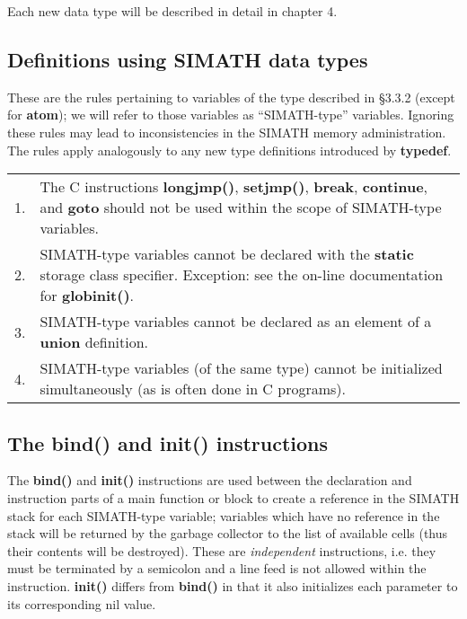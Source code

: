 
Each new data type will be described in detail in chapter 4.

\newpage
\subsection{Definitions using SIMATH data types}
These are the rules per\-tai\-ning to variables of the type described in
\S 3.3.2 (except for {\bf atom}); we will refer to those variables as
``SIMATH-type'' variables. Ignoring these rules may lead to inconsistencies
in the SIMATH memory administration. The rules apply analogously to any
new type definitions introduced by {\bf typedef}.

\begin{tabular}{rp{11.5cm}} 
1. & The C instructions {\bf longjmp()}, {\bf setjmp()}, {\bf break}, 
	{\bf continue}, and {\bf goto} should not be used within the scope of 
	SIMATH-type variables.\\
2. & SIMATH-type variables cannot be declared with the {\bf static} storage
      class specifier. Exception: see the on-line documentation for {\bf globinit()}.\\
3. &  SIMATH-type variables cannot be declared as an element of a {\bf union} definition.\\
4. & SIMATH-type variables (of the same type) cannot be initialized simultaneously
       (as is often done in C programs).\\
\end{tabular}

\subsection{The {\bf bind()} and {\bf init()} instructions}
The {\bf bind()} and {\bf init()} in\-struc\-tions are used between the declaration 
and instruction parts of a main function or block to create
a reference in the SIMATH stack for each SIMATH-type variable; variables which have
no reference in the stack will be returned by the garbage collector to the list of
available cells (thus their contents will be destroyed). These are {\em independent\/}
instructions, i.e. they must be terminated by a semicolon and a line feed is not allowed
within the instruction. {\bf init()} differs from {\bf bind()} in that it also initializes
each parameter to its corresponding nil value.


